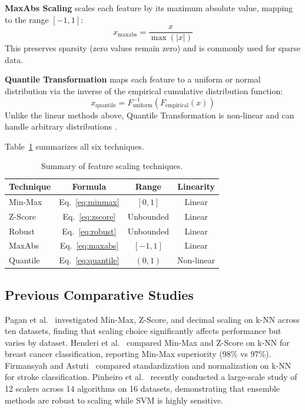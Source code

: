 \documentclass[12pt,a4paper]{article}
\begin{document}
\textbf{MaxAbs Scaling} scales each feature by its maximum absolute value, mapping to the range $[-1, 1]$:
\begin{equation}
  x_{\text{maxabs}} = \frac{x}{\max(|x|)}
  \label{eq:maxabs}
\end{equation}
This preserves sparsity (zero values remain zero) and is commonly used for sparse data.

\textbf{Quantile Transformation} maps each feature to a uniform or normal distribution via the inverse of the empirical cumulative distribution function:
\begin{equation}
  x_{\text{quantile}} = F^{-1}_{\text{uniform}}(F_{\text{empirical}}(x))
  \label{eq:quantile}
\end{equation}
Unlike the linear methods above, Quantile Transformation is non-linear and can handle arbitrary distributions \cite{demircioglu2024normalization}.

Table~\ref{tbl:scalers} summarizes all six techniques.

\begin{table}[ht]
\centering
\caption{Summary of feature scaling techniques.}
\label{tbl:scalers}
\begin{tabular}{lccc}
\toprule
Technique & Formula & Range & Linearity \\
\midrule
Min-Max         & Eq.~\eqref{eq:minmax}  & $[0, 1]$     & Linear \\
Z-Score         & Eq.~\eqref{eq:zscore}  & Unbounded    & Linear \\
Robust          & Eq.~\eqref{eq:robust}  & Unbounded    & Linear \\
MaxAbs          & Eq.~\eqref{eq:maxabs}  & $[-1, 1]$    & Linear \\
Quantile        & Eq.~\eqref{eq:quantile}& $(0, 1)$     & Non-linear \\
\bottomrule
\end{tabular}
\end{table}

\subsection{Previous Comparative Studies}
\label{sec:prev}

Pagan et al.~\cite{pagan2023scaling} investigated Min-Max, Z-Score, and decimal scaling on k-NN across ten datasets, finding that scaling choice significantly affects performance but varies by dataset. Henderi et al.~\cite{henderi2021minmax} compared Min-Max and Z-Score on k-NN for breast cancer classification, reporting Min-Max superiority (98\% vs 97\%). Firmansyah and Astuti~\cite{firmansyah2024stroke} compared standardization and normalization on k-NN for stroke classification. Pinheiro et al.~\cite{pinheiro2025scaling} recently conducted a large-scale study of 12 scalers across 14 algorithms on 16 datasets, demonstrating that ensemble methods are robust to scaling while SVM is highly sensitive.
\end{document}
